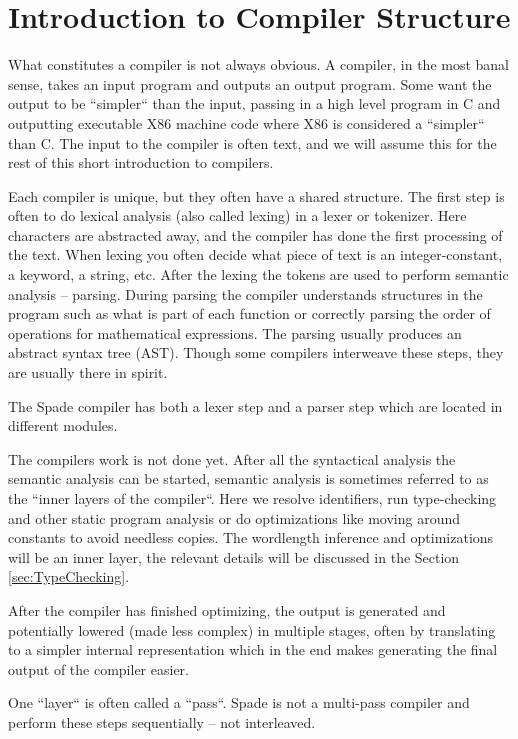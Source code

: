 \documentclass[msc,lith,english]{liuthesis}
\begin{document}
\section{Introduction to Compiler Structure}
What constitutes a compiler is not always obvious. A compiler, in the most banal sense, takes an input program and outputs an output program. Some want the output to be ``simpler`` than the input, passing in a high level program in C and outputting executable X86 machine code where X86 is considered a ``simpler`` than C. The input to the compiler is often text, and we will assume this for the rest of this short introduction to compilers.

Each compiler is unique, but they often have a shared structure. The first step is often to do lexical analysis (also called lexing) in a lexer or tokenizer. Here characters are abstracted away, and the compiler has done the first processing of the text. When lexing you often decide what piece of text is an integer-constant, a keyword, a string, etc. After the lexing the tokens are used to perform semantic analysis -- parsing. During parsing the compiler understands structures in the program such as what is part of each function or correctly parsing the order of operations for mathematical expressions. The parsing usually produces an abstract syntax tree (AST). Though some compilers interweave these steps, they are usually there in spirit.

The Spade compiler has both a lexer step and a parser step which are located in different modules.

The compilers work is not done yet. After all the syntactical analysis the semantic analysis can be started, semantic analysis is sometimes referred to as the ``inner layers of the compiler``. Here we resolve identifiers, run type-checking and other static program analysis or do optimizations like moving around constants to avoid needless copies. The wordlength inference and optimizations will be an inner layer, the relevant details will be discussed in the Section \ref{sec:TypeChecking}. 

After the compiler has finished optimizing, the output is generated and potentially lowered (made less complex) in multiple stages, often by translating to a simpler internal representation which in the end makes generating the final output of the compiler easier.

One ``layer`` is often called a ``pass``. Spade is not a multi-pass compiler and perform these steps sequentially -- not interleaved.
\cite{src:DragonBook}\cite{src:CraftingInterp}\cite{src:KKLectures}
\end{document}
